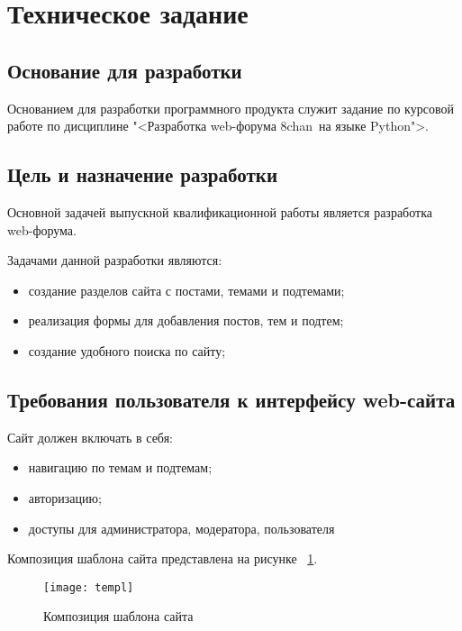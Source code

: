 \section{Техническое задание}
\subsection{Основание для разработки}

Основанием для разработки программного продукта служит задание по курсовой работе по дисциплине  "<Разработка web-форума \textquotedbl 8chan\textquotedbl\ на языке Python">.

\subsection{Цель и назначение разработки}

Основной задачей выпускной квалификационной работы является разработка web-форума.

Задачами данной разработки являются:
\begin{itemize}
\item создание разделов сайта с постами, темами и подтемами;
\item реализация формы для добавления постов, тем и подтем;
\item создание удобного поиска по сайту;
\end{itemize}

\subsection{Требования пользователя к интерфейсу web-сайта}

Сайт должен включать в себя:
\begin{itemize}
    \item навигацию по темам и подтемам;
    \item авторизацию;
    \item доступы для администратора, модератора, пользователя
\end{itemize}

Композиция шаблона сайта представлена на рисунке ~\ref{templ:image}.

\begin{figure}[ht]
\texttt{[image: templ]}
\caption{Композиция шаблона сайта}
\label{templ:image}
\end{figure}

